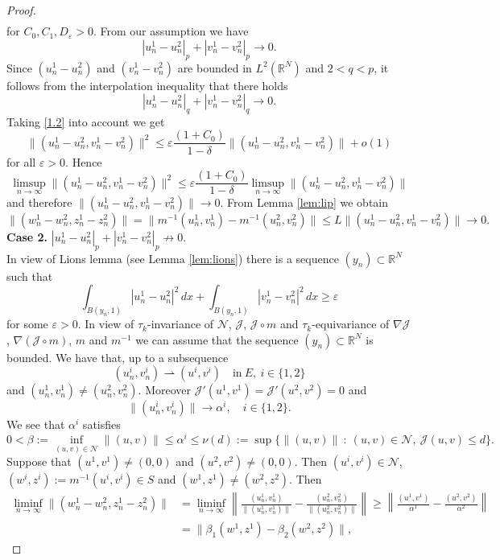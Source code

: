 \documentclass{scrartcl}
\newcommand{\cJ}{{\mathcal J}}
\newcommand{\cN}{{\mathcal N}}
\newcommand{\R}{\mathbb{R}}
\newcommand{\weakto}{\rightharpoonup}
\numberwithin{equation}{section}
\begin{document}
\begin{proof}
\begin{align*}
\end{align*}
for $C_0, C_1, D_\varepsilon > 0$. From our assumption we have
$$
|u_n^1 - u_n^2|_p + |v_n^1 - v_n^2|_p \to 0.
$$
Since $(u_n^1 - u_n^2)$ and $(v_n^1 - v_n^2)$ are bounded in $L^2(\R^N)$ and $2 <q <p$, it follows from the interpolation inequality that there holds
$$
|u_n^1 - u_n^2|_q + |v_n^1 - v_n^2|_q \to 0.
$$
Taking \eqref{1.2} into account we get
$$
\| (u_n^1 - u_n^2, v_n^1 - v_n^2) \|^2 \leq \varepsilon \frac{(1+C_0)}{1-\delta} \| (u_n^1 - u_n^2, v_n^1 - v_n^2) \| + o(1)
$$
for all $\varepsilon > 0$. Hence
$$
\limsup_{n\to\infty} \| (u_n^1 - u_n^2, v_n^1 - v_n^2) \|^2 \leq \varepsilon \frac{(1+C_0)}{1-\delta} \limsup_{n\to\infty}\| (u_n^1 - u_n^2, v_n^1 - v_n^2) \|
$$
and therefore $\| (u_n^1 - u_n^2, v_n^1 - v_n^2) \| \to 0$. From Lemma \ref{lem:lip} we obtain
$$
\|(w_n^1 - w_n^2, z_n^1 - z_n^2)\| = \| m^{-1} (u_n^1, v_n^1) - m^{-1} (u_n^2, v_n^2) \| \leq L \| (u_n^1 - u_n^2, v_n^1 - v_n^2) \| \to 0.
$$
\textbf{Case 2.} $|u_n^1 - u_n^2|_p + |v_n^1 - v_n^2|_p \not\to 0$. \\
In view of Lions lemma (see Lemma \ref{lem:lions}) there is a sequence $(y_n) \subset \R^N$ such that
$$
\int_{B(y_n,1)} |u_n^1 - u_n^2|^2 \, dx + \int_{B(y_n,1)} |v_n^1 - v_n^2|^2 \, dx \geq \varepsilon
$$
for some $\varepsilon > 0$. In view of $\tau_k$-invariance of $\cN$, $\cJ$, $\cJ \circ m$ and $\tau_k$-equivariance of $\nabla \cJ$, $\nabla (\cJ \circ m)$, $m$ and $m^{-1}$ we can assume that the sequence $(y_n) \subset \R^N$ is bounded. We have that, up to a subsequence
$$
(u_n^i, v_n^i) \weakto (u^i, v^i) \quad \mathrm{in} \ E,  \ i \in \{1,2\} 
$$
and $(u_n^1, v_n^1) \neq (u_n^2, v_n^2)$. Moreover $\cJ'(u^1,v^1) = \cJ'(u^2,v^2) = 0$ and
$$
\| (u_n^i, v_n^i) \| \to \alpha^i, \quad i \in \{1,2\}.
$$
We see that $\alpha^i$ satisfies
$$
0 < \beta := \inf_{(u,v) \in \cN} \| (u,v) \| \leq \alpha^i \leq \nu(d) := \sup \{ \| (u,v) \| \ : \ (u,v) \in \cN, \ \cJ(u,v) \leq d \}.
$$
Suppose that $(u^1, v^1) \neq (0,0)$ and $(u^2, v^2) \neq (0,0)$. Then $(u^i, v^i) \in \cN$, $(w^i, z^i) := m^{-1} (u^i, v^i) \in S$ and $(w^1, z^1) \neq (w^2, z^2)$. Then
\begin{align*}
\liminf_{n\to\infty} \| (w_n^1-w_n^2, z_n^1-z_n^2) \| &= \liminf_{n\to\infty} \left\| \frac{(u_n^1,v_n^1)}{\|(u_n^1,v_n^1)\|} - \frac{(u_n^2,v_n^2)}{\|(u_n^2,v_n^2)\|} \right\| \geq \left\| \frac{(u^1,v^1)}{\alpha^1} - \frac{(u^2,v^2)}{\alpha^2} \right\| \\ &= \| \beta_1 (w^1, z^1) - \beta_2 (w^2, z^2) \|,

\end{align*}
\end{proof}
\end{document}
